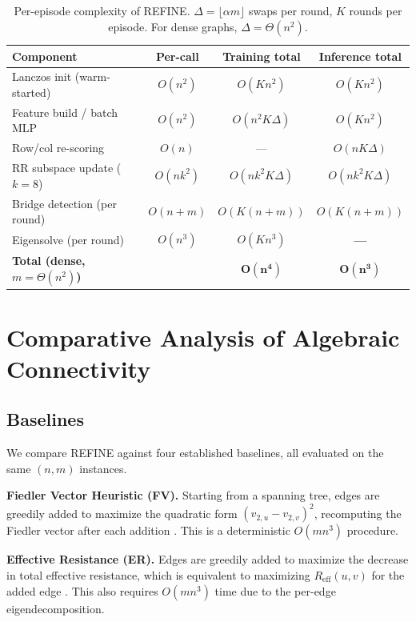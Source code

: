 \documentclass{article}
\begin{document}
\begin{table}[t]
\centering
\caption{Per-episode complexity of REFINE. $\Delta = \lfloor\alpha m\rfloor$ swaps per round, $K$ rounds per episode. For dense graphs, $\Delta = \Theta(n^2)$.}\label{tab:complexity}
\begin{tabular}{@{}lccc@{}}
\toprule
\textbf{Component} & \textbf{Per-call} & \textbf{Training total} & \textbf{Inference total} \\
\midrule
Lanczos init (warm-started) & $O(n^2)$ & $O(Kn^2)$ & $O(Kn^2)$ \\
Feature build / batch MLP & $O(n^2)$ & $O(n^2 K\Delta)$ & $O(Kn^2)$ \\
Row/col re-scoring & $O(n)$ & --- & $O(nK\Delta)$ \\
RR subspace update ($k{=}8$) & $O(nk^2)$ & $O(nk^2 K\Delta)$ & $O(nk^2 K\Delta)$ \\
Bridge detection (per round) & $O(n + m)$ & $O(K(n{+}m))$ & $O(K(n{+}m))$ \\
Eigensolve (per round) & $O(n^3)$ & $O(Kn^3)$ & \textbf{---} \\
\midrule
\textbf{Total (dense, $m = \Theta(n^2)$)} & & $\boldsymbol{O(n^4)}$ & $\boldsymbol{O(n^3)}$ \\
\bottomrule
\end{tabular}
\end{table}

\section{Comparative Analysis of Algebraic Connectivity}

\subsection{Baselines}\label{sec:baselines}

We compare REFINE against four established baselines, all evaluated on the same $(n, m)$ instances.

\textbf{Fiedler Vector Heuristic (FV).} Starting from a spanning tree, edges are greedily added to maximize the quadratic form $(v_{2,u} - v_{2,v})^2$, recomputing the Fiedler vector after each addition \cite{ghosh2006growing}. This is a deterministic $O(mn^3)$ procedure.

\textbf{Effective Resistance (ER).} Edges are greedily added to maximize the decrease in total effective resistance, which is equivalent to maximizing $R_{\text{eff}}(u, v)$ for the added edge \cite{ghosh2008maximizing}. This also requires $O(mn^3)$ time due to the per-edge eigendecomposition.
\end{document}
